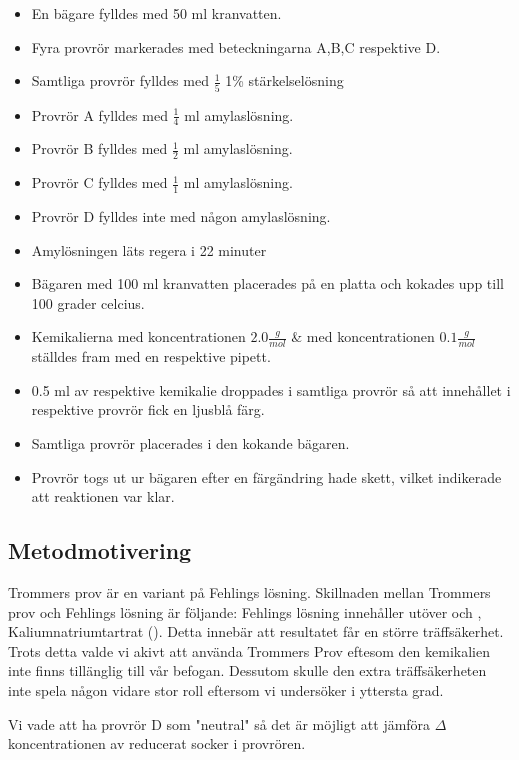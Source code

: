 \documentclass[a4paper,12pt]{article}
\begin{document}
	\begin{itemize}
		\item En bägare fylldes med 50 ml kranvatten.
		\item Fyra provrör markerades med beteckningarna A,B,C respektive D. 
		\item Samtliga provrör fylldes med $\frac{1}{5}$ 1\% stärkelselösning
		\item Provrör A fylldes med $\frac{1}{4}$ ml amylaslösning. 
		\item Provrör B fylldes med $\frac{1}{2}$ ml amylaslösning. 
		\item Provrör C fylldes med $\frac{1}{1}$ ml amylaslösning. 
		\item Provrör D fylldes inte med någon amylaslösning. 
		\item Amylösningen läts regera i 22 minuter
		\item Bägaren med 100 ml kranvatten placerades på en platta och kokades upp till 100 grader celcius. 
		\item Kemikalierna  med koncentrationen $2.0\frac{g}{mol}$ \&  med koncentrationen $0.1\frac{g}{mol}$ ställdes fram med en respektive pipett.
		\item 0.5 ml av respektive kemikalie droppades i samtliga provrör så att innehållet i respektive provrör fick en ljusblå färg.  
		\item Samtliga provrör placerades i den kokande bägaren.
		\item Provrör togs ut ur bägaren efter en färgändring hade skett, vilket indikerade att reaktionen var klar.  
	\end{itemize}


\subsection{Metodmotivering}

	Trommers prov är en variant på Fehlings lösning. Skillnaden mellan Trommers prov och Fehlings lösning är följande: Fehlings lösning innehåller utöver  och , Kaliumnatriumtartrat (). Detta innebär att resultatet får en större träffsäkerhet. Trots detta valde vi akivt att använda Trommers Prov eftesom den kemikalien inte finns tillänglig till vår befogan. Dessutom skulle den extra träffsäkerheten inte spela någon vidare stor roll eftersom vi undersöker i yttersta grad.  
	
	Vi vade att ha provrör D som "neutral" så det är möjligt att jämföra $\Delta$ koncentrationen av reducerat socker i provrören.
\end{document}
